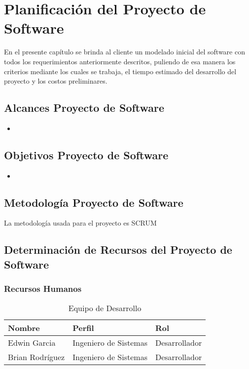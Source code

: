 \chapter{Planificaci\'on del Proyecto de Software}
En el presente cap\'itulo se brinda al cliente un modelado inicial del software con todos los requerimientos anteriormente descritos, puliendo de esa manera los criterios mediante los cuales se trabaja, el tiempo estimado del desarrollo del proyecto y los costos preliminares.

\section{Alcances Proyecto de Software}
\begin{itemize}
	\item 
\end{itemize}
\section{Objetivos Proyecto de Software}
\begin{itemize}
	\item 
\end{itemize}
\section{Metodolog\'ia Proyecto de Software}
La metodolog\'ia usada para el proyecto es SCRUM

\section{Determinaci\'on de Recursos del Proyecto de Software}
\subsection{Recursos Humanos}
\begin{table}[h!]
	\begin{center}
		\begin{tabular}{|p{5cm} |p{5cm}|p{4cm}|} 
			\hline \textbf{Nombre} & \textbf{Perfil} & \textbf{Rol} \\
			\hline Edwin Garcia & Ingeniero de Sistemas & Desarrollador \\ 
			\hline Brian Rodr\'iguez & Ingeniero de Sistemas & Desarrollador \\
			\hline
		\end{tabular}
		\caption{Equipo de Desarrollo}
		\label{teamDevelop}
	\end{center}
\end{table}
